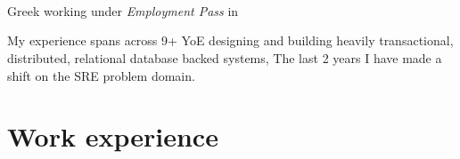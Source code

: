 \documentclass{CVSoftwareEngineer}
\begin{document}
	\section{\textbf{\cvname}}
	\begin{center}
		\href{mailto:\cvmail}{\cvmail} \space \textbar \space \cvlinkedin \space \textbar \space \cvgithub \\
		Greek working under \textit{Employment Pass} in \cvaddress
	\end{center}
	My experience spans across 9+ YoE designing and building heavily transactional, distributed,
	relational database backed systems, The last 2 years I have made a shift on the SRE problem domain.

	\section{Work experience}
\end{document}

